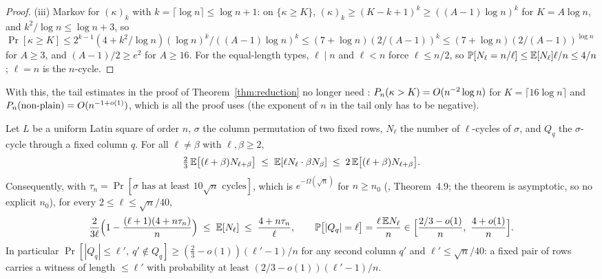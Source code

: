 \begin{proof}
(iii) Markov for $(\kappa)_k$ with $k=\lceil\log n\rceil\le\log n+1$:
on $\{\kappa\ge K\}$, $(\kappa)_k\ge(K-k+1)^k\ge((A-1)\log n)^k$ for
$K=A\log n$, and $k^2/\log n\le\log n+3$, so
$\Pr[\kappa\ge K]\le2^{k-1}(4+k^2/\log n)(\log n)^k/((A-1)\log n)^k
\le(7+\log n)(2/(A-1))^{k}\le(7+\log n)(2/(A-1))^{\log n}$ for $A\ge3$,
and $(A-1)/2\ge e^2$ for $A\ge16$.  For the equal-length types,
$\ell\mid n$ and $\ell<n$ force $\ell\le n/2$, so
$\mathbb{P}[N_\ell=n/\ell]\le\mathbb{E}[N_\ell]\ell/n\le4/n$; $\ell=n$ is the $n$-cycle.
\end{proof}

With this, the tail estimates in the proof of Theorem~\ref{thm:reduction}
no longer need \cite[Cor.~4.5]{CGW08}: $P_n(\kappa>K)=O(n^{-2}\log n)$
for $K=\lceil16\log n\rceil$ and $P_n(\text{non-plain})=O(n^{-1+o(1)})$,
which is all the proof uses (the exponent of $n$ in the tail only has
to be negative).


\begin{proposition}\label{prop:shortcycles}
Let $L$ be a uniform Latin square of order $n$, $\sigma$ the column
permutation of two fixed rows, $N_\ell$ the number of $\ell$-cycles of
$\sigma$, and $Q_q$ the $\sigma$-cycle through a fixed column $q$.
For all $\ell\ne\beta$ with $\ell,\beta\ge2$,
\begin{equation}\label{eq:cgwprod}
\tfrac23\,\mathbb{E}\bigl[(\ell+\beta)N_{\ell+\beta}\bigr]\;\le\;\mathbb{E}[\ell N_\ell\cdot\beta N_\beta]\;\le\;2\,\mathbb{E}\bigl[(\ell+\beta)N_{\ell+\beta}\bigr].
\end{equation}
Consequently, with $\tau_n=\Pr[\sigma\text{ has at least }10\sqrt n\text{ cycles}]$,
which is $e^{-\Omega(\sqrt n)}$ for $n\ge n_0$ (\cite{CGW08}, Theorem~4.9; the
theorem is asymptotic, so no explicit $n_0$), for every $2\le\ell\le\sqrt n/40$,
\[
\frac{2}{3\ell}\Bigl(1-\frac{(\ell+1)(4+n\tau_n)}{n}\Bigr)\;\le\;\mathbb{E}[N_\ell]\;\le\;\frac{4+n\tau_n}{\ell},
\qquad
\mathbb{P}\bigl[|Q_q|=\ell\bigr]=\frac{\ell\,\mathbb{E} N_\ell}{n}\in\Bigl[\frac{2/3-o(1)}{n},\ \frac{4+o(1)}{n}\Bigr].
\]
In particular $\Pr[|Q_q|\le\ell',\ q'\notin Q_q]\ge(\tfrac23-o(1))(\ell'-1)/n$
for any second column $q'$ and $\ell'\le\sqrt n/40$: a fixed pair of
rows carries a witness of length $\le\ell'$ with probability at least
$(2/3-o(1))(\ell'-1)/n$.
\end{proposition}

